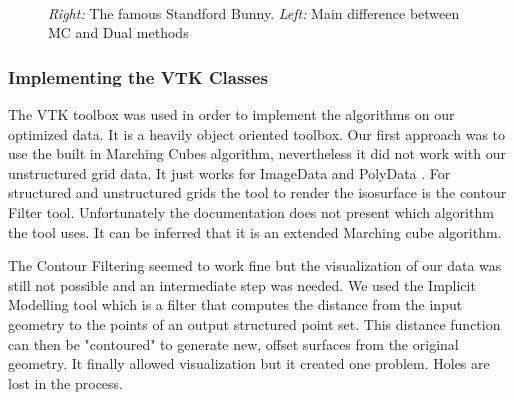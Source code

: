 \begin{figure}
\centering
   \\
   \caption{\textit{Right:} The famous Standford Bunny. \textit{Left:} Main difference between MC and Dual methods }
\end{figure}

\subsubsection{Implementing the VTK Classes}
The VTK toolbox was used in order to implement the algorithms on our optimized data. It is a heavily object
oriented toolbox. Our first approach was to use the built in Marching Cubes algorithm,
nevertheless it did not work with our unstructured grid data. It just works for ImageData and
PolyData . For structured and unstructured grids the tool to render the isosurface is the contour
Filter tool. Unfortunately the documentation does not present which algorithm the tool uses. It
can be inferred that it is an extended Marching cube algorithm.

The Contour Filtering seemed to work fine but the visualization of our data was still not possible
and an intermediate step was needed. We used the Implicit Modelling tool which is a filter that
computes the distance from the input geometry to the points of an output structured point set.
This distance function can then be "contoured" to generate new, offset surfaces from the original
geometry. It finally allowed visualization but it created one problem. Holes are lost in
the process.

